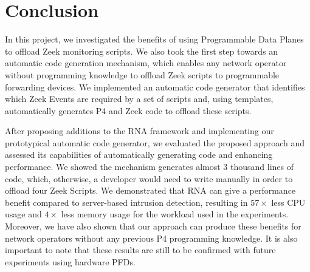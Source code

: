 \chapter{Conclusion}
\label{cap:conclusion}

In this project, we investigated the benefits of using Programmable Data Planes to offload Zeek monitoring scripts. We also took the first step towards an automatic code generation mechanism, which enables any network operator without programming knowledge to offload Zeek scripts to programmable forwarding devices. We implemented an automatic code generator that identifies which Zeek Events are required by a set of scripts and, using templates, automatically generates P4 and Zeek code to offload these scripts.

After proposing additions to the RNA framework and implementing our prototypical automatic code generator, we evaluated the proposed approach and assessed its capabilities of automatically generating code and enhancing performance. We showed the mechanism generates almost $3$ thousand lines of code, which, otherwise, a developer would need to write manually in order to offload four Zeek Scripts. We demonstrated that RNA can give a performance benefit compared to server-based intrusion detection, resulting in $57\times$ less CPU usage and $4\times$ less memory usage for the workload used in the experiments. Moreover, we have also shown that our approach can produce these benefits for network operators without any previous P4 programming knowledge. It is also important to note that these results are still to be confirmed with future experiments using hardware PFDs.






